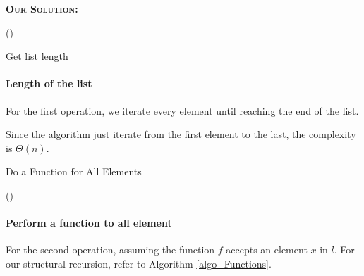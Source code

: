 \documentclass{exam}
\renewenvironment{solution}{\textsc{\textbf{Our Solution:}} \par}{}
\begin{document}
\begin{questions}
\begin{parts}
\begin{solution}
\begin{algorithm}

				\BlankLine

				\Begin(\getLength){

					\caption{Get list length}
					\label{algo_Length}
				}

			\end{algorithm}
			\paragraph{Length of the list} For the first operation, we iterate every element until reaching the end of the list.

			Since the algorithm just iterate from the first element to the last, the complexity is $\Theta(n)$.

			\begin{algorithm}
				\caption{Do a Function for All Elements}
				\label{algo_Functions}


				\BlankLine

				\Begin(\Function){


				}


			\end{algorithm}

			\paragraph{Perform a function to all element} For the second operation, assuming the function $f$ accepts an element $x$ in $l$. For our structural recursion, refer to Algorithm \ref{algo_Functions}.


\end{solution}
\end{parts}
\end{questions}
\end{document}
